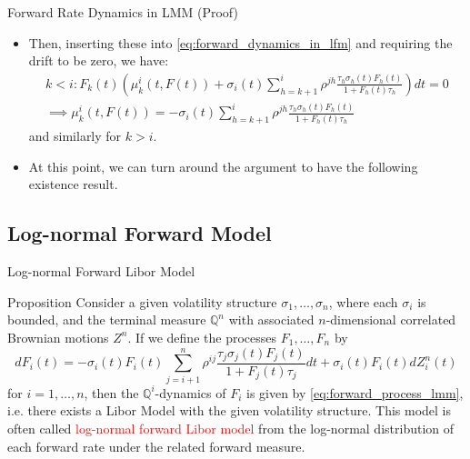 \documentclass{beamer}
\begin{document}
\begin{frame}{Forward Rate Dynamics in LMM (Proof)}
	\begin{itemize}
	\item<1-> Then, inserting these into \cref{eq:forward_dynamics_in_lfm} and requiring the drift to be zero, we have:
		\begin{equation*}
			\begin{gathered}
				k < i : F_k(t)\left( \mu_k^i(t, F(t)) + \sigma_i(t)\sum_{h=k+1}^i \rho^{jh} \frac{\tau_h\sigma_h(t)F_h(t)}{1+F_h(t)\tau_h}\right) dt = 0 \\
				\implies \mu_k^i(t, F(t)) = - \sigma_i(t)\sum_{h=k+1}^i \rho^{jh} \frac{\tau_h\sigma_h(t)F_h(t)}{1+F_h(t)\tau_h}
			\end{gathered}
		\end{equation*}
		and similarly for $k > i$.
	\item<2-> At this point, we can turn around the argument to have the following existence result.
	\end{itemize}
\end{frame}

\subsection{Log-normal Forward Model}
\begin{frame}{Log-normal Forward Libor Model}
  \begin{block}{Proposition}
    Consider a given volatility structure $\sigma_1,\ldots, \sigma_n$, where each $\sigma_i$ is bounded, and the terminal measure $\mathbb{Q}^n$ with associated $n$-dimensional correlated Brownian motions $Z^n$. If we define the processes $F_1,\ldots, F_n$ by
    \begin{equation}
      dF_i(t) = -\sigma_i(t)F_i(t)\sum_{j=i+1}^n \rho^{ij} \frac{\tau_j\sigma_j(t)F_j(t)}{1+F_j(t)\tau_j} dt + \sigma_i(t)F_i(t)dZ^n_i(t)
    \end{equation}
    for $i = 1,\ldots, n$, then the $\mathbb{Q}^i$-dynamics of $F_i$ is given by \cref{eq:forward_process_lmm}, i.e. there exists a Libor Model with the given volatility structure.
  This model is often called \textcolor{red}{log-normal forward Libor model} from the log-normal distribution of each forward rate under the related forward measure.
  \end{block}
\end{frame}
\end{document}
